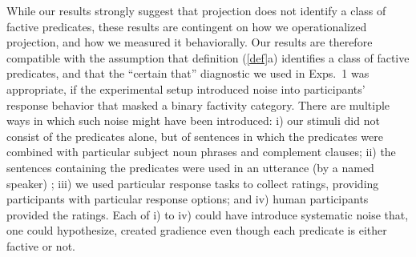\documentclass[11pt,fleqn]{article}
\newcommand{\6}{\mbox{$[\hspace*{-.6mm}[$}}
\newcommand{\9}{\mbox{$]\hspace*{-.6mm}]$}}
\begin{document}

While our results strongly suggest that projection does not identify a class of factive predicates, these results are contingent on how we operationalized projection, and how we measured it behaviorally. Our results are therefore compatible with the assumption that definition (\ref{def}a) identifies a class of factive predicates, and that the ``certain that'' diagnostic we used in Exps.~1 was appropriate, if the experimental setup introduced noise into participants' response behavior that masked a binary factivity category. There are multiple ways in which such noise might have been introduced: i) our stimuli did not consist of the predicates alone, but of sentences in which the predicates were combined with particular subject noun phrases and complement clauses; ii) the sentences containing the predicates were used in an utterance (by a named speaker) ; iii) we used particular response tasks to collect ratings, providing participants with particular response options; and iv) human participants provided the ratings. Each of i) to iv) could have introduce systematic noise that, one could hypothesize, created gradience even though each predicate is either factive or not. 
\end{document}
